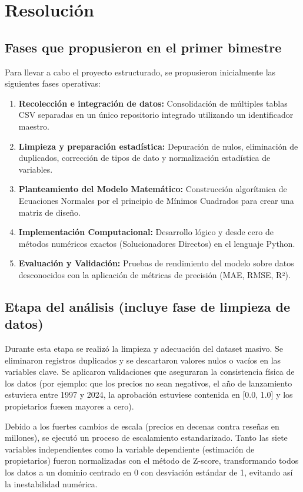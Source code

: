 \documentclass[12pt]{report}
\begin{document}
\section*{Resolución}

\subsection*{Fases que propusieron en el primer bimestre}
Para llevar a cabo el proyecto estructurado, se propusieron inicialmente las siguientes fases operativas:
\begin{enumerate}
    \item \textbf{Recolección e integración de datos:} Consolidación de múltiples tablas CSV separadas en un único repositorio integrado utilizando un identificador maestro.
    \item \textbf{Limpieza y preparación estadística:} Depuración de nulos, eliminación de duplicados, corrección de tipos de dato y normalización estadística de variables.
    \item \textbf{Planteamiento del Modelo Matemático:} Construcción algorítmica de Ecuaciones Normales por el principio de Mínimos Cuadrados para crear una matriz de diseño.
    \item \textbf{Implementación Computacional:} Desarrollo lógico y desde cero de métodos numéricos exactos (Solucionadores Directos) en el lenguaje Python.
    \item \textbf{Evaluación y Validación:} Pruebas de rendimiento del modelo sobre datos desconocidos con la aplicación de métricas de precisión (MAE, RMSE, R²).
\end{enumerate}

\subsection*{Etapa del análisis (incluye fase de limpieza de datos)}
Durante esta etapa se realizó la limpieza y adecuación del dataset masivo. Se eliminaron registros duplicados y se descartaron valores nulos o vacíos en las variables clave. Se aplicaron validaciones que aseguraran la consistencia física de los datos (por ejemplo: que los precios no sean negativos, el año de lanzamiento estuviera entre 1997 y 2024, la aprobación estuviese contenida en [0.0, 1.0] y los propietarios fuesen mayores a cero).

Debido a los fuertes cambios de escala (precios en decenas contra reseñas en millones), se ejecutó un proceso de escalamiento estandarizado. Tanto las siete variables independientes como la variable dependiente (estimación de propietarios) fueron normalizadas con el método de Z-score, transformando todos los datos a un dominio centrado en 0 con desviación estándar de 1, evitando así la inestabilidad numérica.
\end{document}
